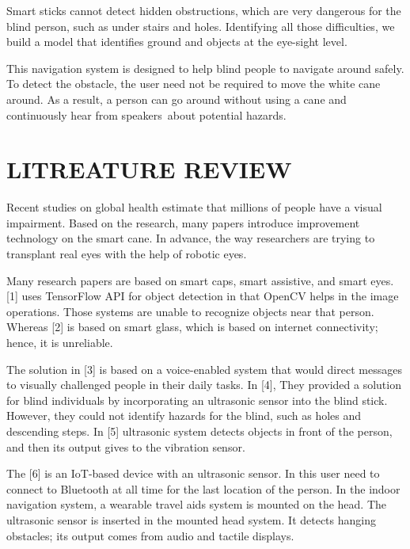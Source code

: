 \documentclass[conference]{IEEEtran}
\begin{document}
Smart sticks cannot detect hidden obstructions, which are very dangerous for the blind person, such as under stairs and holes. Identifying all those difficulties, we build a model that identifies ground and objects at the eye-sight level. 

This navigation system is designed to help blind people to navigate around safely. To detect the obstacle, the user need not be required to move the white cane around. As a result, a person can go around without using a cane and continuously hear from speakers about potential hazards.


\section{LITREATURE REVIEW}
Recent studies on global health estimate that millions of people have a visual impairment. Based on the research, many papers introduce improvement technology on the smart cane. In advance, the way researchers are trying to transplant real eyes with the help of robotic eyes. 

Many research papers are based on smart caps, smart assistive, and smart eyes. [1] uses TensorFlow API for object detection in that OpenCV helps in the image operations. Those systems are unable to recognize objects near that person. Whereas [2] is based on smart glass, which is based on internet connectivity; hence, it is unreliable. 

The solution in [3] is based on a voice-enabled system that would direct messages to visually challenged people in their daily tasks. In [4], They provided a solution for blind individuals by incorporating an ultrasonic sensor into the blind stick. However, they could not identify hazards for the blind, such as holes and descending steps. In [5] ultrasonic system detects objects in front of the person, and then its output gives to the vibration sensor. 

The [6] is an IoT-based device with an ultrasonic sensor. In this user need to connect to Bluetooth at all time for the last location of the person. In the indoor navigation system, a wearable travel aids system is mounted on the head. The ultrasonic sensor is inserted in the mounted head system. It detects hanging obstacles; its output comes from audio and tactile displays. 
\end{document}
